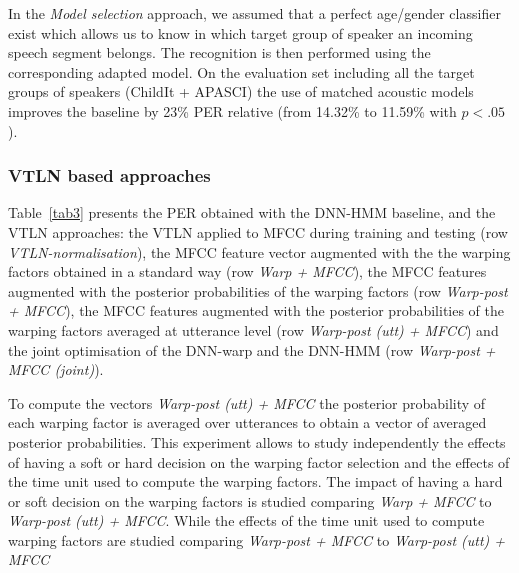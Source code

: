 \documentclass{nle}
\begin{document}
In the {\em Model selection} approach, we assumed that a perfect age/gender classifier exist which allows us to know in which target group of speaker an incoming speech segment belongs. The recognition is then performed using the corresponding adapted model. On the evaluation set including all the target groups of speakers (ChildIt + APASCI) the use of matched acoustic models  improves the baseline by 23\% PER relative (from 14.32\% to 11.59\% with $p<.05$).

\subsubsection{VTLN based approaches}
Table~\ref{tab3}  presents the PER obtained with the DNN-HMM baseline, and the VTLN approaches: the VTLN applied to MFCC during training and testing (row {\em VTLN-normalisation}), the MFCC feature vector augmented with the the warping factors obtained in a standard way (row {\em Warp + MFCC}), the MFCC features augmented with the posterior probabilities of the warping factors (row {\em Warp-post + MFCC}), the MFCC features augmented with the posterior probabilities of the warping factors averaged at utterance level (row {\em Warp-post (utt) + MFCC}) and the joint optimisation of the DNN-warp and the DNN-HMM (row {\em Warp-post + MFCC (joint)}). 

To compute the vectors {\em Warp-post (utt) + MFCC} the posterior probability of each warping factor is averaged over utterances to obtain a vector of averaged posterior probabilities. This experiment allows to study independently the effects of having a soft or hard decision on the warping factor selection and the effects of the time unit used to compute the warping factors. The impact of having a hard or soft decision on the warping factors is studied comparing {\em Warp + MFCC} to {\em Warp-post (utt) + MFCC}. While the effects of the time unit used to compute warping factors are studied comparing {\em Warp-post + MFCC} to {\em Warp-post (utt) + MFCC}
\end{document}
